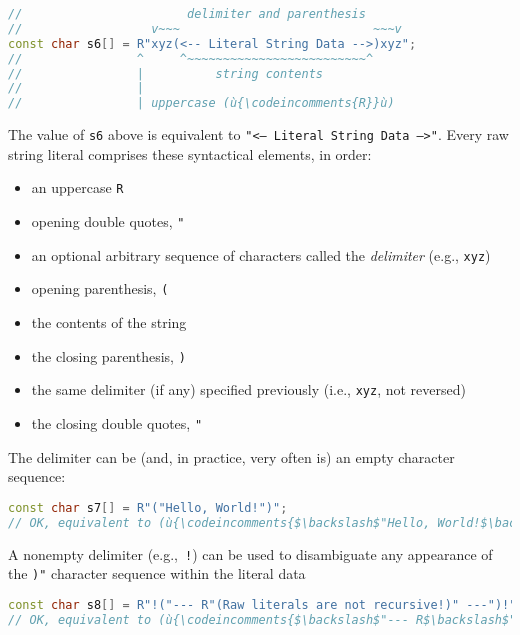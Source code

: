 \begin{lstlisting}[language=C++]
//                       delimiter and parenthesis
//                  v~~~                           ~~~v
const char s6[] = R"xyz(<-- Literal String Data -->)xyz";
//                ^     ^~~~~~~~~~~~~~~~~~~~~~~~~~^
//                |          string contents
//                |
//                | uppercase (ù{\codeincomments{R}}ù)
\end{lstlisting}

\noindent The value of \texttt{s6} above is equivalent to
\texttt{"<--}~\texttt{Literal}~\texttt{String}~\texttt{Data}~\texttt{-->"}.
Every raw string literal comprises these syntactical elements, in order:
\begin{itemize}
\item{an uppercase \texttt{R}}
\item{opening double quotes, \texttt{"}}
\item{an optional arbitrary sequence of characters called the \emph{delimiter} (e.g., \texttt{xyz})}
\item{opening parenthesis, \texttt{(}}
\item{the contents of the string}
\item{the closing parenthesis, \texttt{)}}
\item{the same delimiter (if any) specified previously (i.e., \texttt{xyz}, not reversed)}
\item{the closing double quotes, \texttt{"}}
\end{itemize}

The delimiter can be (and, in practice, very often is) an empty character
sequence:

\begin{lstlisting}[language=C++]
const char s7[] = R"("Hello, World!")";
// OK, equivalent to (ù{\codeincomments{$\backslash$"Hello, World!$\backslash$"}}ù)
\end{lstlisting}

\noindent A nonempty delimiter (e.g.,~\texttt{!}) can be used to disambiguate any
appearance of the \texttt{)"} character sequence within the literal data

\begin{lstlisting}[language=C++]
const char s8[] = R"!("--- R"(Raw literals are not recursive!)" ---")!";
// OK, equivalent to (ù{\codeincomments{$\backslash$"--- R$\backslash$"(Raw literals are not recursive!)$\backslash$" ---$\backslash$"}}ù)
\end{lstlisting}

